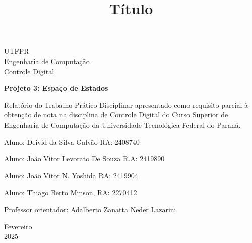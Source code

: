 \documentclass[a4paper, 12pt]{article}
\begin{document}
\begin{titlepage}
	\begin{center}
	

		\Huge{UTFPR}\\
		\large{Engenharia de Computação}\\ 
		\large{Controle Digital}\\ 
\vspace{15pt}
        
        \vspace{85pt}
        
		\textbf{\LARGE{Projeto 3: Espaço de Estados}}
		\title{\large{Título}}
			
	\end{center}
\vspace{1,5cm}
	
	\begin{flushright}

   \begin{list}{}{
      \setlength{\leftmargin}{4.5cm}
      \setlength{\rightmargin}{0cm}
      \setlength{\labelwidth}{0pt}
      \setlength{\labelsep}{\leftmargin}}

      \item Relatório do Trabalho Prático Disciplinar apresentado como requisito parcial à obtenção de nota na disciplina de Controle Digital do Curso Superior de Engenharia de Computação da Universidade Tecnológica Federal do Paraná.

      \begin{list}{}{
      \setlength{\leftmargin}{0cm}
      \setlength{\rightmargin}{0cm}
      \setlength{\labelwidth}{0pt}
      \setlength{\labelsep}{\leftmargin}}

                \item Aluno: Deivid da Silva Galvão RA: 2408740\\
               \item  Aluno: João Vitor Levorato De Souza
R.A: 2419890\\
                \item Aluno: João Vitor N. Yoshida RA: 2419904\\
                \item Aluno: Thiago Berto Minson, RA: 2270412\\
            \item Professor orientador:  Adalberto Zanatta Neder Lazarini \

      \end{list}
   \end{list}
\end{flushright}
\vspace{1cm}
\begin{center}
		\vspace{\fill}
		 Fevereiro\\
		 2025
			\end{center}
\end{titlepage}
\end{document}
